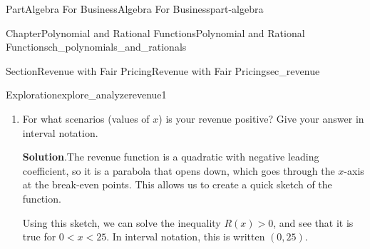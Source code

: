 \documentclass{tufte-book}
\newcommand{\blocktitlefont}{\relax}
\numberwithin{equation}{chapter}
\newcommand{\lt}{<}
\newcommand{\gt}{>}
\newcommand{\amp}{&}
\begin{document}
\begin{partptx}{Part}{Algebra For Business}{}{Algebra For Business}{}{}{part-algebra}
\begin{chapterptx}{Chapter}{Polynomial and Rational Functions}{}{Polynomial and Rational Functions}{}{}{ch_polynomials_and_rationals}
\begin{sectionptx}{Section}{Revenue with Fair Pricing}{}{Revenue with Fair Pricing}{}{}{sec_revenue}
\begin{exploration}{Exploration}{}{explore_analyzerevenue1}
\begin{enumerate}[font=\bfseries,label=(\alph*),ref=\alph*]
\begin{descriptionlist}
\begin{dlimedium}{Solving by Factoring}{explore_analyzerevenue1-2-2-2-1-2}
\par
To find the second point, solve the second equation for \(x\)%
\begin{align*}
-0.4x \amp + 10 \amp = \amp 0  \\
\amp - 10 \amp \amp - 10 \\
\amp \\
-0.4x \amp \amp  = \amp -10  \\
\div -0.4 \amp \amp \div -0.4 \\
\amp \\
x \amp \amp = \amp 25
\end{align*}
%
\par
The revenue equals zero when \(x=0\) or \(x=25\).%
\end{dlimedium}%
\end{descriptionlist}
%
\item{}For what scenarios (values of \(x\)) is your revenue positive? Give your answer in interval notation.%
\par\smallskip%
\noindent\textbf{\blocktitlefont Solution}.\hypertarget{explore_analyzerevenue1-3-2}{}\quad{}The revenue function is a quadratic with negative leading coefficient, so it is a parabola that opens down, which goes through the \(x\)-axis at the break-even points.  This allows us to create a quick sketch of the function.%
\par
Using this sketch, we can solve the inequality \(R(x)\gt 0\), and see that it is true for \(0\lt x \lt 25\).  In interval notation, this is written \((0,25)\).%
\begin{image}{0.25}{0.5}{0.25}{}%
\end{image}
\end{enumerate}
\end{exploration}
\end{sectionptx}
\end{chapterptx}
\end{partptx}
\end{document}
